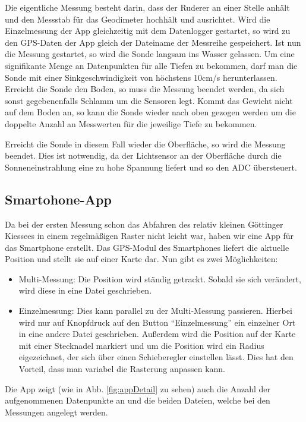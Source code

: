 \documentclass[12pt,a4paper,titlepage,headinclude,bibtotoc]{scrartcl}
\begin{document}
Die eigentliche Messung besteht darin, dass der Ruderer an einer Stelle anhält und den Messstab für das Geodimeter hochhält und ausrichtet.
Wird die Einzelmessung der App gleichzeitig mit dem Datenlogger gestartet, so wird zu den GPS-Daten der App gleich der Dateiname der Messreihe gespeichert.
Ist nun die Messung gestartet, so wird die Sonde langsam ins Wasser gelassen.
Um eine signifikante Menge an Datenpunkten für alle Tiefen zu bekommen, darf man die Sonde mit einer Sinkgeschwindigkeit von höchstens 10cm/s herunterlassen.
Erreicht die Sonde den Boden, so muss die Messung beendet werden, da sich sonst gegebenenfalls Schlamm um die Sensoren legt.
Kommt das Gewicht nicht auf dem Boden an, so kann die Sonde wieder nach oben gezogen werden um die doppelte Anzahl an Messwerten für die jeweilige Tiefe zu bekommen.

Erreicht die Sonde in diesem Fall wieder die Oberfläche, so wird die Messung beendet.
Dies ist notwendig, da der Lichtsensor an der Oberfläche durch die Sonneneinstrahlung eine zu hohe Spannung liefert und so den ADC übersteuert.

\subsection{Smartohone-App}
\label{sec:app}
Da bei der ersten Messung schon das Abfahren des relativ kleinen Göttinger Kiessees in einem regelmäßigen Raster nicht leicht war, haben wir eine App für das Smartphone erstellt.
Das GPS-Modul des Smartphones liefert die aktuelle Position und stellt sie auf einer Karte dar.
Nun gibt es zwei Möglichkeiten:
\begin{itemize}
	\item Multi-Messung: Die Position wird ständig getrackt.
		Sobald sie sich verändert, wird diese in eine Datei geschrieben.
	\item Einzelmessung: Dies kann parallel zu der Multi-Messung passieren.
		Hierbei wird nur auf Knopfdruck auf den Button "`Einzelmessung"' ein einzelner Ort in eine andere Datei geschrieben.
		Außerdem wird die Position auf der Karte mit einer Stecknadel markiert und um die Position wird ein Radius eigezeichnet, der sich über einen Schieberegler einstellen lässt.
		Dies hat den Vorteil, dass man variabel die Rasterung anpassen kann.
\end{itemize}

Die App zeigt (wie in Abb. \ref{fig:appDetail} zu sehen) auch die Anzahl der aufgenommenen Datenpunkte an und die beiden Dateien, welche bei den Messungen angelegt werden.
\end{document}
